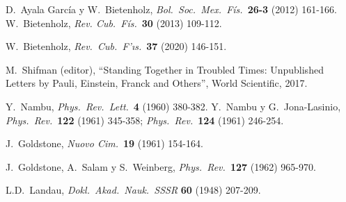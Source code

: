\begin{thebibliography}{10}
 D.\ Ayala Garc\'ia y W.\ Bietenholz,
{\em Bol.\ Soc.\ Mex.\ F\'is.}\ {\bf 26-3} (2012) 161-166.  
W.\ Bietenholz,
{\em Rev. Cub.\ F\'is.}\ {\bf 30} (2013) 109-112.

  W.\ Bietenholz,
{\em Rev.\ Cub.\ F\a'{\i}s.}\ {\bf 37} (2020) 146-151.

 M.\ Shifman (editor), ``Standing Together in Troubled
  Times: Unpublished Letters by Pauli, Einstein, Franck and Others'',
  World Scientific, 2017.

 Y.\ Nambu,
{\em Phys.\ Rev.\ Lett.}\ {\bf 4} (1960) 380-382.
Y.\ Nambu y G.\ Jona-Lasinio,
{\em Phys.\ Rev.}\ {\bf 122} (1961) 345-358;
{\em Phys.\ Rev.}\ {\bf 124} (1961) 246-254.

 J.\ Goldstone,
{\em Nuovo Cim.}\ {\bf 19} (1961) 154-164.
  
 J.\ Goldstone, A.\ Salam y S.\ Weinberg,
  {\em Phys.\ Rev.}\ {\bf 127} (1962) 965-970.

 L.D.\ Landau, 
{\em Dokl.\ Akad.\ Nauk.\ SSSR} {\bf 60} (1948) 207-209.

\end{thebibliography}